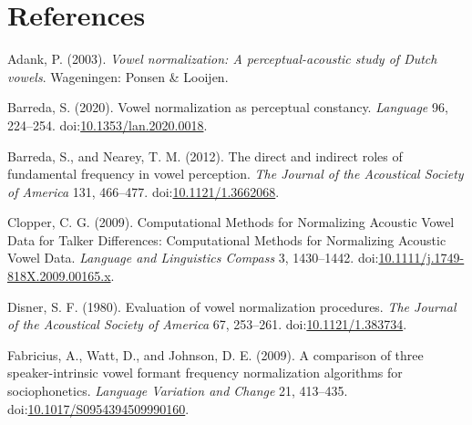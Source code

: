\documentclass[utf8]{frontiers_suppmat} %
\newlength{\cslhangindent}
\newlength{\cslentryspacingunit} %
\newenvironment{CSLReferences}[2] %
 {%
  \setlength{\parindent}{0pt}
  \ifodd #1
  \let\oldpar\par
  \def\par{\hangindent=\cslhangindent\oldpar}
  \fi
  \setlength{\parskip}{#2\cslentryspacingunit}
 }%
 {}
\begin{document}
\hypertarget{sec:references}{%
%
\section*{References}\label{sec:references}}

\begingroup
\setlength{\parindent}{-0.5in}
\setlength{\leftskip}{0.5in}

\hypertarget{refs}{}
\begin{CSLReferences}{1}{0}
\leavevmode{}%
Adank, P. (2003). \emph{Vowel normalization: A perceptual-acoustic study of {Dutch} vowels}. {Wageningen}: {Ponsen \& Looijen}.

\leavevmode{}%
Barreda, S. (2020). Vowel normalization as perceptual constancy. \emph{Language} 96, 224--254. doi:\href{https://doi.org/10.1353/lan.2020.0018}{10.1353/lan.2020.0018}.

\leavevmode{}%
Barreda, S., and Nearey, T. M. (2012). The direct and indirect roles of fundamental frequency in vowel perception. \emph{The Journal of the Acoustical Society of America} 131, 466--477. doi:\href{https://doi.org/10.1121/1.3662068}{10.1121/1.3662068}.

\leavevmode{}%
Clopper, C. G. (2009). Computational {Methods} for {Normalizing Acoustic Vowel Data} for {Talker Differences}: {Computational Methods} for {Normalizing Acoustic Vowel Data}. \emph{Language and Linguistics Compass} 3, 1430--1442. doi:\href{https://doi.org/10.1111/j.1749-818X.2009.00165.x}{10.1111/j.1749-818X.2009.00165.x}.

\leavevmode{}%
Disner, S. F. (1980). Evaluation of vowel normalization procedures. \emph{The Journal of the Acoustical Society of America} 67, 253--261. doi:\href{https://doi.org/10.1121/1.383734}{10.1121/1.383734}.

\leavevmode{}%
Fabricius, A., Watt, D., and Johnson, D. E. (2009). A comparison of three speaker-intrinsic vowel formant frequency normalization algorithms for sociophonetics. \emph{Language Variation and Change} 21, 413--435. doi:\href{https://doi.org/10.1017/S0954394509990160}{10.1017/S0954394509990160}.


\end{CSLReferences}
\end{document}
